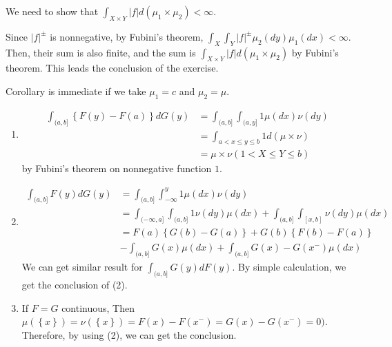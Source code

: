 \begin{problem}[1.7.1] \hfill

	We need to show that $\int_{X \times Y} |f| d(\mu_1 \times \mu_2) < \infty$.

	Since $|f|^{\pm}$ is nonnegative, by Fubini's theorem, $\int_X \int_Y |f|^{\pm} \mu_2(dy) \mu_1(dx) < \infty$. Then, their sum is also finite, and the sum is $\int_{X\times Y} |f| d(\mu_1 \times \mu_2)$ by Fubini's theorem. This leads the conclusion of the exercise.

	Corollary is immediate if we take $\mu_1 = c$ and $\mu_2 = \mu$.

\end{problem}

\begin{problem}[1.7.3] \hfill
	\begin{enumerate}
		\item \begin{equation*}
				\begin{split}
					\int_{(a, b]}\left\{ F(y) - F(a) \right\}dG(y) & = \int_{(a, b]} \int_{(a, y]} 1 \mu(dx) \nu(dy) \\
					& = \int_{a < x \leq y \leq b} 1 d(\mu \times \nu) \\
					& = \mu \times \nu (1 < X \leq Y \leq b)
				\end{split}
				\label{<+label+>}
			\end{equation*}
			by Fubini's theorem on nonnegative function $1$.
		\item \begin{equation*}
				\begin{split}
					\int_{(a, b]}F(y)dG(y) & = \int_{(a, b]} \int_{-\infty}^y 1 \mu(dx) \nu(dy) \\
					& = \int_{(-\infty, a]} \int_{(a, b]} 1 \nu(dy) \mu(dx) + \int_{(a, b]} \int_{[x, b]} \nu(dy) \mu(dx) \\
					& = F(a)\left\{ G(b) - G(a) \right\} + G(b)\left\{ F(b) - F(a) \right\} \\
					& - \int_{(a, b]} G(x) \mu(dx) + \int_{(a, b]} G(x) - G(x^-) \mu(dx)
				\end{split}
				\label{<+label+>}
			\end{equation*}
			We can get similar result for $\int_{(a, b]} G(y) dF(y)$. By simple calculation, we get the conclusion of (2).

		\item If $F = G$ continuous, Then $\mu(\left\{ x \right\}) = \nu(\left\{ x \right\}) = F(x) - F(x^-) = G(x) - G(x^-) = 0)$. Therefore, by using (2), we can get the conclusion.

		\end{enumerate}
\end{problem}

